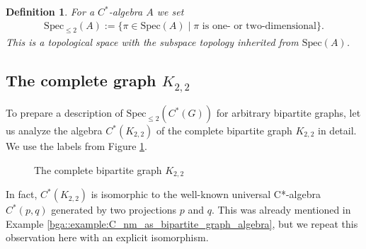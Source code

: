 \documentclass[a4paper]{amsart}
\newtheorem{definition}[thm]{Definition}
\begin{document}
\begin{definition}
    For a $C^\ast$-algebra $A$ we set
    \begin{align*}
        \mathrm{Spec}_{\leq 2}(A) := \{ \pi \in \mathrm{Spec}(A) \mid \pi \text{ is one- or two-dimensional}\}.
    \end{align*}
    This is a topological space with the subspace topology inherited from $\mathrm{Spec}(A)$.
\end{definition}

\subsection{The complete graph \texorpdfstring{$K_{2,2}$}{K22}}

To prepare a description of $\mathrm{Spec}_{\leq 2}(C^\ast(G))$ for arbitrary bipartite graphs, let us analyze the algebra $C^\ast(K_{2,2})$ of the complete bipartite graph $K_{2,2}$ in detail. We use the labels from Figure \ref{reps::fig:K22}.
\begin{figure}[hbt]
    \caption{The complete bipartite graph $K_{2,2}$}
    \label{reps::fig:K22}
\end{figure}
In fact, $C^\ast(K_{2,2})$ is isomorphic to the well-known universal C*-algebra $C^\ast(p,q)$ generated by two projections $p$ and $q$. This was already mentioned in Example \ref{bga::example:C_nm_as_bipartite_graph_algebra}, but we repeat this observation here with an explicit isomorphism.
\end{document}
